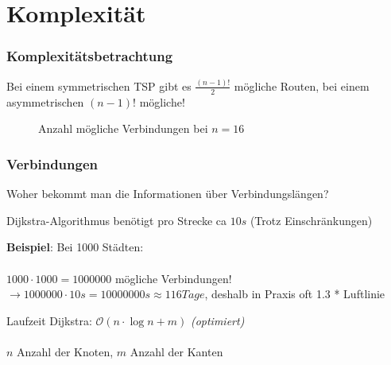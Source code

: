 \documentclass[handout]{beamer}
\begin{document}
  \section{Komplexität}
  \begin{frame}
    \frametitle{Komplexitätsbetrachtung}
    Bei einem symmetrischen TSP gibt es $\frac{(n-1)!}{2}$ mögliche Routen,
    bei einem asymmetrischen $(n-1)!$ mögliche!

    \newcount\mycount

    \begin{figure}
      \centering
      \caption{Anzahl mögliche Verbindungen bei $n=16$}
    \end{figure}
  \end{frame}

  \begin{frame}
    \frametitle{Verbindungen}

    Woher bekommt man die Informationen über Verbindungslängen?
    \pause
    \vspace{2em}

    Dijkstra-Algorithmus benötigt pro Strecke ca $10s$ (Trotz Einschränkungen)

    \pause
    \vspace{1em}

    \textbf{Beispiel}: Bei 1000 Städten: \\~\\
    $1000 \cdot 1000 = 1 000 000$ mögliche Verbindungen!
    $\rightarrow 1 000 000 \cdot 10s = 10 000 000s \approx 116 Tage$,
    deshalb in Praxis oft 1.3 * Luftlinie

    \vspace{1em}
    Laufzeit Dijkstra: $\mathcal O(n \cdot \log n + m)$ \textit{(optimiert)}
    \\~\\
    $n$ Anzahl der Knoten, $m$ Anzahl der Kanten
  \end{frame}
\end{document}
